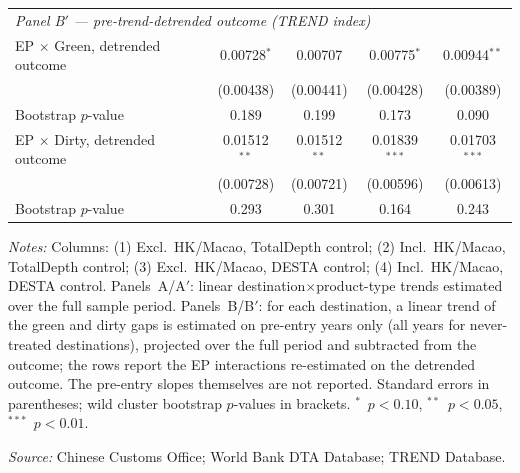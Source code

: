 \begin{table}[p]
\begin{threeparttable}
\begin{tabular}{lcccc}
\multicolumn{5}{l}{\textit{Panel B$'$ --- pre-trend-detrended outcome (TREND index)}} \\
EP $\times$ Green, detrended outcome & 0.00728$^{*}$ & 0.00707 & 0.00775$^{*}$ & 0.00944$^{**}$ \\
 & (0.00438) & (0.00441) & (0.00428) & (0.00389) \\
\quad Bootstrap $p$-value & 0.189 & 0.199 & 0.173 & 0.090 \\
EP $\times$ Dirty, detrended outcome & 0.01512$^{**}$ & 0.01512$^{**}$ & 0.01839$^{***}$ & 0.01703$^{***}$ \\
 & (0.00728) & (0.00721) & (0.00596) & (0.00613) \\
\quad Bootstrap $p$-value & 0.293 & 0.301 & 0.164 & 0.243 \\
\bottomrule
\end{tabular}
\begin{tablenotes}[flushleft]\footnotesize
\item \emph{Notes:} Columns: (1) Excl.\ HK/Macao, TotalDepth control; (2) Incl.\ HK/Macao, TotalDepth control; (3) Excl.\ HK/Macao, DESTA control; (4) Incl.\ HK/Macao, DESTA control. Panels~A/A$'$: linear destination$\times$product-type trends estimated over the full sample period. Panels~B/B$'$: for each destination, a linear trend of the green and dirty gaps is estimated on pre-entry years only (all years for never-treated destinations), projected over the full period and subtracted from the outcome; the rows report the EP interactions re-estimated on the detrended outcome. The pre-entry slopes themselves are not reported. Standard errors in parentheses; wild cluster bootstrap $p$-values in brackets. $^{*}$~$p<0.10$, $^{**}$~$p<0.05$, $^{***}$~$p<0.01$.
\item \textit{Source:} Chinese Customs Office; World Bank DTA Database; TREND Database.
\end{tablenotes}
\end{threeparttable}
\end{table}
